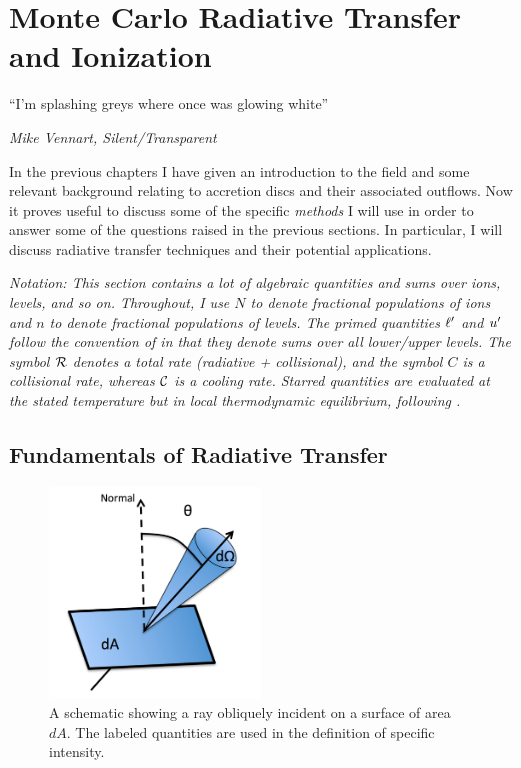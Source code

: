 \chapter{Monte Carlo Radiative Transfer and Ionization}

\epigraph{``I'm splashing greys where once was glowing white''}{{\sl Mike Vennart, Silent/Transparent}}

In the previous chapters I have given an introduction to the field and 
some relevant background relating to accretion 
discs and their associated outflows. Now it proves useful
to discuss some of the specific {\em methods} I will use
in order to answer some of the questions raised in the previous sections.
In particular, I will discuss radiative transfer techniques and 
their potential applications.

{\sl Notation: This section contains a lot of algebraic quantities and sums over
ions, levels, and so on. Throughout, I use $N$ to denote fractional
populations of ions and $n$ to denote fractional populations of levels. 
The primed quantities ${\ell^\prime}$ and ${u^\prime}$ follow the convention of 
\cite{lucy2002} in that they denote sums over all lower/upper levels.
The symbol ${\cal R}$ denotes a total rate (radiative + collisional), 
and the symbol $C$ is a collisional rate, whereas ${\cal C}$ is a cooling 
rate. Starred quantities are evaluated at the stated temperature but 
in local thermodynamic equilibrium, following \cite{mihalas}. 
}



\section{Fundamentals of Radiative Transfer}

\begin{figure}
\centering
\includegraphics[width=0.5\textwidth]{figures/03-radtrans/rays_schematic.png}
\caption
{
A schematic showing a ray obliquely incident on a surface of area $dA$.
The labeled quantities are used in the definition of specific intensity.
} 
\label{fig:ray}
\end{figure}

